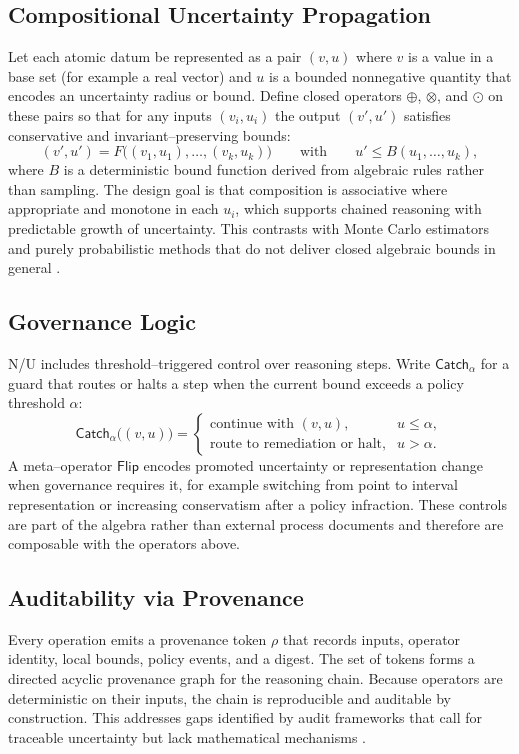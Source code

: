 \documentclass[11pt]{article}
\begin{document}
\subsection{Compositional Uncertainty Propagation}
Let each atomic datum be represented as a pair $(v,u)$ where $v$ is a value in a base set (for example a real vector) and $u$ is a bounded nonnegative quantity that encodes an uncertainty radius or bound. Define closed operators $\oplus$, $\otimes$, and $\odot$ on these pairs so that for any inputs $(v_i,u_i)$ the output $(v',u')$ satisfies conservative and invariant--preserving bounds:
\begin{equation}
(v',u') = F\big((v_1,u_1),\dots,(v_k,u_k)\big)
\qquad \text{with} \qquad
u' \leq B(u_1,\dots,u_k),
\end{equation}
where $B$ is a deterministic bound function derived from algebraic rules rather than sampling. The design goal is that composition is associative where appropriate and monotone in each $u_i$, which supports chained reasoning with predictable growth of uncertainty. This contrasts with Monte Carlo estimators and purely probabilistic methods that do not deliver closed algebraic bounds in general \cite{NASA2023,Padilla2022}.

\subsection{Governance Logic}
N/U includes threshold--triggered control over reasoning steps. Write $\mathsf{Catch}_\alpha$ for a guard that routes or halts a step when the current bound exceeds a policy threshold $\alpha$:
\begin{equation}
\mathsf{Catch}_\alpha\big((v,u)\big)=
\begin{cases}
\text{continue with } (v,u), & u \le \alpha,\\[2pt]
\text{route to remediation or halt}, & u > \alpha.
\end{cases}
\end{equation}
A meta--operator $\mathsf{Flip}$ encodes promoted uncertainty or representation change when governance requires it, for example switching from point to interval representation or increasing conservatism after a policy infraction. These controls are part of the algebra rather than external process documents and therefore are composable with the operators above.

\subsection{Auditability via Provenance}
Every operation emits a provenance token $\rho$ that records inputs, operator identity, local bounds, policy events, and a digest. The set of tokens forms a directed acyclic provenance graph for the reasoning chain. Because operators are deterministic on their inputs, the chain is reproducible and auditable by construction. This addresses gaps identified by audit frameworks that call for traceable uncertainty but lack mathematical mechanisms \cite{IIA2024,IBM2025}.
\end{document}
